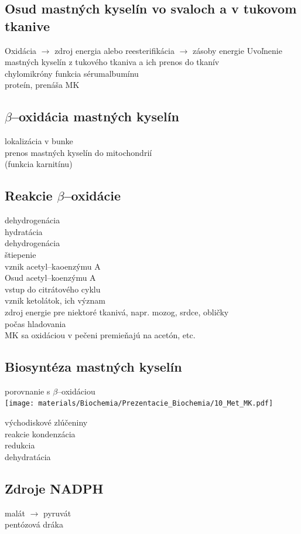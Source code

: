 \subsection*{Osud mastných kyselín vo svaloch a v tukovom tkanive}
Oxidácia $\rightarrow$ zdroj energia alebo reesterifikácia $\rightarrow$ zásoby energie
Uvoľnenie mastných kyselín z tukového tkaniva a ich prenos do tkanív\\
\tab chylomikróny
funkcia sérumalbumínu\\
\tab proteín, prenáša MK
\subsection*{$\beta$--oxidácia mastných kyselín}
lokalizácia v bunke\\
prenos mastných kyselín do mitochondrií\\
\tab (funkcia karnitínu)\\
\subsection*{Reakcie $\beta$--oxidácie}
dehydrogenácia\\
hydratácia\\
dehydrogenácia\\
štiepenie\\
vznik acetyl--kaoenzýmu A\\
Osud acetyl--koenzýmu A\\
\tab vstup do citrátového cyklu\\
vznik ketolátok, ich význam\\
\tab zdroj energie pre niektoré tkanivá, napr. mozog, srdce, obličky\\
\tab počas hladovania\\
\tab MK sa oxidáciou v pečeni premieňajú na acetón, etc.\\
\subsection*{Biosyntéza mastných kyselín}
porovnanie s $\beta$--oxidáciou\\

\texttt{[image: materials/Biochemia/Prezentacie\_Biochemia/10\_Met\_MK.pdf]}

východiskové zlúčeniny\\
reakcie kondenzácia\\
redukcia\\
dehydratácia\\
\subsection*{Zdroje NADPH}
malát $\rightarrow$ pyruvát\\
pentózová dráka\\
